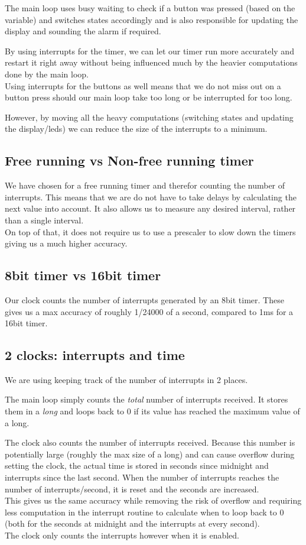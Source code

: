 \documentclass[11pt,a4paper]{scrartcl}
\begin{document}
The main loop uses busy waiting to check if a button was pressed (based on the variable) and switches states accordingly and is also responsible for updating the display and sounding the alarm if required.

By using interrupts for the timer, we can let our timer run more accurately and restart it right away without being influenced much by the heavier computations done by the main loop.\\
Using interrupts for the buttons as well means that we do not miss out on a button press should our main loop take too long or be interrupted for too long.

However, by moving all the heavy computations (switching states and updating the display/leds) we can reduce the size of the interrupts to a minimum.

\subsection{Free running vs Non-free running timer}
We have chosen for a free running timer and therefor counting the number of interrupts. This means that we are do not have to take delays by calculating the next value into account. It also allows us to measure any desired interval, rather than a single interval.\\
On top of that, it does not require us to use a prescaler to slow down the timers giving us a much higher accuracy.

\subsection{8bit timer vs 16bit timer}
Our clock counts the number of interrupts generated by an 8bit timer. These gives us a max accuracy of roughly 1/24000 of a second, compared to 1ms for a 16bit timer.


\subsection{2 clocks: interrupts and time}
We are using keeping track of the number of interrupts in 2 places.

The main loop simply counts the \textit{total} number of interrupts received. It stores them in a \textit{long} and loops back to 0 if its value has reached the maximum value of a long.

The clock also counts the number of interrupts received. Because this number is potentially large (roughly the max size of a long) and can cause overflow during setting the clock, the actual time is stored in seconds since midnight and interrupts since the last second. When the number of interrupts reaches the number of interrupts/second, it is reset and the seconds are increased.\\
This gives us the same accuracy while removing the risk of overflow and requiring less computation in the interrupt routine to calculate when to loop back to 0 (both for the seconds at midnight and the interrupts at every second).\\
The clock only counts the interrupts however when it is enabled.
\end{document}
